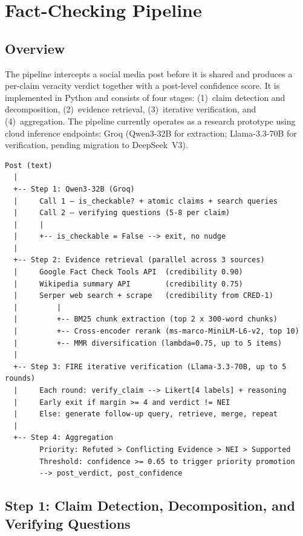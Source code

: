 \section{Fact-Checking Pipeline}

\subsection{Overview}

The pipeline intercepts a social media post before it is shared and produces a per-claim veracity verdict together with a post-level confidence score. It is implemented in Python and consists of four stages: (1)~claim detection and decomposition, (2)~evidence retrieval, (3)~iterative verification, and (4)~aggregation. The pipeline currently operates as a research prototype using cloud inference endpoints: Groq (Qwen3-32B for extraction; Llama-3.3-70B for verification, pending migration to DeepSeek~V3).

\bigskip
\begin{verbatim}
Post (text)
  |
  +-- Step 1: Qwen3-32B (Groq)
  |     Call 1 — is_checkable? + atomic claims + search queries
  |     Call 2 — verifying questions (5-8 per claim)
  |     |
  |     +-- is_checkable = False --> exit, no nudge
  |
  +-- Step 2: Evidence retrieval (parallel across 3 sources)
  |     Google Fact Check Tools API  (credibility 0.90)
  |     Wikipedia summary API        (credibility 0.75)
  |     Serper web search + scrape   (credibility from CRED-1)
  |         |
  |         +-- BM25 chunk extraction (top 2 x 300-word chunks)
  |         +-- Cross-encoder rerank (ms-marco-MiniLM-L6-v2, top 10)
  |         +-- MMR diversification (lambda=0.75, up to 5 items)
  |
  +-- Step 3: FIRE iterative verification (Llama-3.3-70B, up to 5 rounds)
  |     Each round: verify_claim --> Likert[4 labels] + reasoning
  |     Early exit if margin >= 4 and verdict != NEI
  |     Else: generate follow-up query, retrieve, merge, repeat
  |
  +-- Step 4: Aggregation
        Priority: Refuted > Conflicting Evidence > NEI > Supported
        Threshold: confidence >= 0.65 to trigger priority promotion
        --> post_verdict, post_confidence
\end{verbatim}

\subsection{Step 1: Claim Detection, Decomposition, and Verifying Questions}

